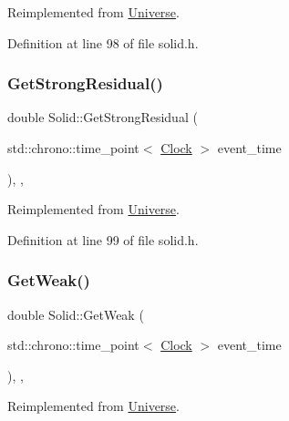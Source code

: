 Reimplemented from \hyperlink{class_universe_ab44daccba01ee7e3cf9b50bba83dd19e}{Universe}.



Definition at line 98 of file solid.\+h.

\mbox{\label{class_solid_a9cfde1c3a4b7c6d2a5a3719d74e27237}} 
\subsubsection{\texorpdfstring{Get\+Strong\+Residual()}{GetStrongResidual()}}
{\footnotesize\ttfamily double Solid\+::\+Get\+Strong\+Residual (\begin{DoxyParamCaption}\item[{std\+::chrono\+::time\+\_\+point$<$ \hyperlink{universe_8h_a0ef8d951d1ca5ab3cfaf7ab4c7a6fd80}{Clock} $>$}]{event\+\_\+time }\end{DoxyParamCaption})\hspace{0.3cm}{\ttfamily [inline]}, {\ttfamily [final]}, {\ttfamily [virtual]}}



Reimplemented from \hyperlink{class_universe_af0f4b81950061e63c2855eb40957a5b1}{Universe}.



Definition at line 99 of file solid.\+h.

\mbox{\label{class_solid_ac8a7738735a6bda4e89414a2b0c370e1}} 
\subsubsection{\texorpdfstring{Get\+Weak()}{GetWeak()}}
{\footnotesize\ttfamily double Solid\+::\+Get\+Weak (\begin{DoxyParamCaption}\item[{std\+::chrono\+::time\+\_\+point$<$ \hyperlink{universe_8h_a0ef8d951d1ca5ab3cfaf7ab4c7a6fd80}{Clock} $>$}]{event\+\_\+time }\end{DoxyParamCaption})\hspace{0.3cm}{\ttfamily [inline]}, {\ttfamily [final]}, {\ttfamily [virtual]}}



Reimplemented from \hyperlink{class_universe_a4476b7e0a3fc1764909f556257fd9ec7}{Universe}.



